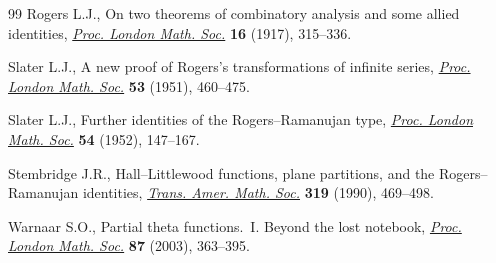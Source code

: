 \documentclass[pdftex]{sigma}
\numberwithin{equation}{section}
\begin{document}
\begin{thebibliography}{99}
Rogers L.J., On two theorems of combinatory analysis and some allied
 identities, \href{https://doi.org/10.1112/plms/s2-16.1.315}{\textit{Proc. London Math. Soc.}} \textbf{16} (1917), 315--336.

Slater L.J., A new proof of {R}ogers's transformations of infinite series,
 \href{https://doi.org/10.1112/plms/s2-53.6.460}{\textit{Proc. London Math. Soc.}} \textbf{53} (1951), 460--475.

Slater L.J., Further identities of the {R}ogers--{R}amanujan type,
 \href{https://doi.org/10.1112/plms/s2-54.2.147}{\textit{Proc. London Math. Soc.}} \textbf{54} (1952), 147--167.

Stembridge J.R., Hall--{L}ittlewood functions, plane partitions, and the
 {R}ogers--{R}amanujan identities, \href{https://doi.org/10.2307/2001250}{\textit{Trans. Amer. Math. Soc.}}
 \textbf{319} (1990), 469--498.

Warnaar S.O., Partial theta functions.~{I}. {B}eyond the lost notebook,
 \href{https://doi.org/10.1112/S002461150201403X}{\textit{Proc. London Math. Soc.}} \textbf{87} (2003), 363--395.

\end{thebibliography}\LastPageEnding
\end{document}
